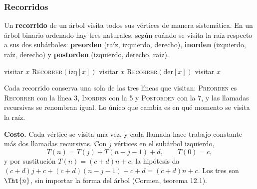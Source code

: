 \documentclass[11pt,letterpaper]{article}
\begin{document}

\subsubsection*{Recorridos}

Un \textbf{recorrido} de un árbol visita todos sus vértices de manera
sistemática. En un árbol binario ordenado hay tres naturales, según
cuándo se visita la raíz respecto a sus dos subárboles:
\textbf{preorden} (raíz, izquierdo, derecho), \textbf{inorden}
(izquierdo, raíz, derecho) y \textbf{postorden} (izquierdo, derecho,
raíz).

\begin{algorithm}[H]
\caption{\textsc{Recorrer}$(x)$: los tres recorridos de un árbol
         binario}
\label{alg:arbol-recorridos}
\begin{algorithmic}[1]
    \State visitar $x$ 
    \State \textsc{Recorrer}$(\text{izq}[x])$
    \State visitar $x$ 
    \State \textsc{Recorrer}$(\text{der}[x])$
    \State visitar $x$ 
  \EndIf
\EndProcedure
\end{algorithmic}
\end{algorithm}

Cada recorrido conserva una sola de las tres líneas que visitan:
\textsc{Preorden} es \textsc{Recorrer} con la línea 3,
\textsc{Inorden} con la 5 y \textsc{Postorden} con la 7, y las
llamadas recursivas se renombran igual. Lo único que cambia es en qué
momento se visita la raíz.

\textbf{Costo.} Cada vértice se visita una vez, y cada llamada hace
trabajo constante más dos llamadas recursivas. Con $j$ vértices en el
subárbol izquierdo,
\[
  T(n) = T(j) + T(n - j - 1) + d , \qquad T(0) = c ,
\]
y por sustitución $T(n) = (c + d)n + c$: la hipótesis da
$(c + d)j + c + (c + d)(n - j - 1) + c + d = (c + d)n + c$. Los tres
son $\Tht{n}$, sin importar la forma del árbol (Cormen, teorema
12.1).
\end{document}
